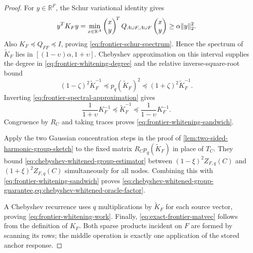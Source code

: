 \begin{proof}
For $y\in\mathbb R^F$, the Schur variational identity gives
\begin{equation*}
 y^TK_Fy
 =\min_{x\in\mathbb R^A}
 \begin{pmatrix}x\\y\end{pmatrix}^{\!T}
 Q_{A\cup F,A\cup F}
 \begin{pmatrix}x\\y\end{pmatrix}
 \geq\alpha\lVert y\rVert_2^2.
\end{equation*}
Also $K_F\preceq Q_{FF}\preceq I$, proving
\cref{eq:frontier-schur-spectrum}.  Hence the spectrum of
$\widetilde K_F$ lies in
$[(1-\upsilon)\alpha,1+\upsilon]$.  Chebyshev approximation on this interval
supplies the degree in \cref{eq:frontier-whitening-degree} and the relative
inverse-square-root bound
\begin{equation*}
 (1-\zeta)^2\widetilde K_F^{-1}
 \preceq p_q(\widetilde K_F)^2
 \preceq(1+\zeta)^2\widetilde K_F^{-1}.
\end{equation*}
Inverting \cref{eq:frontier-spectral-approximation} gives
\begin{equation*}
 \frac1{1+\upsilon}K_F^{-1}
 \preceq\widetilde K_F^{-1}
 \preceq\frac1{1-\upsilon}K_F^{-1}.
\end{equation*}
Congruence by $R_C$ and taking traces proves
\cref{eq:frontier-whitening-sandwich}.

Apply the two Gaussian concentration steps in the proof of
\cref{lem:two-sided-harmonic-group-sketch} to the fixed matrix
$R_Cp_q(\widetilde K_F)$ in place of $T_C$.  They bound
\cref{eq:chebyshev-whitened-group-estimator} between
$(1-\xi)^2Z_{F,q}(C)$ and $(1+\xi)^2Z_{F,q}(C)$ simultaneously for all
nodes.  Combining this with \cref{eq:frontier-whitening-sandwich} proves
\cref{eq:chebyshev-whitened-group-guarantee,eq:chebyshev-whitened-oracle-factor}.

A Chebyshev recurrence uses $q$ multiplications by $\widetilde K_F$ for each
source vector, proving \cref{eq:frontier-whitening-work}.  Finally,
\cref{eq:exact-frontier-matvec} follows from the definition of $K_F$.
Both sparse products incident on $F$ are formed by scanning its rows; the
middle operation is exactly one application of the stored anchor response.
\end{proof}

